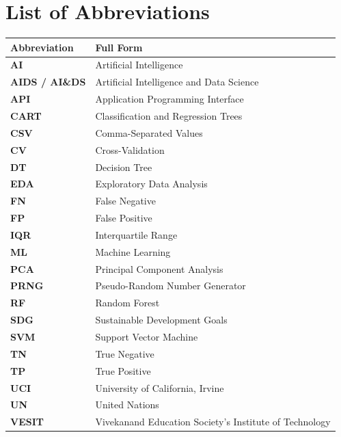 \chapter*{List of Abbreviations}

\begin{longtable}{p{3cm} p{11cm}}
\toprule
\textbf{Abbreviation} & \textbf{Full Form} \\
\midrule
\endhead
\bottomrule
\endfoot
\textbf{AI} & Artificial Intelligence \\
\textbf{AIDS / AI\&DS} & Artificial Intelligence and Data Science \\
\textbf{API} & Application Programming Interface \\
\textbf{CART} & Classification and Regression Trees \\
\textbf{CSV} & Comma-Separated Values \\
\textbf{CV} & Cross-Validation \\
\textbf{DT} & Decision Tree \\
\textbf{EDA} & Exploratory Data Analysis \\
\textbf{FN} & False Negative \\
\textbf{FP} & False Positive \\
\textbf{IQR} & Interquartile Range \\
\textbf{ML} & Machine Learning \\
\textbf{PCA} & Principal Component Analysis \\
\textbf{PRNG} & Pseudo-Random Number Generator \\
\textbf{RF} & Random Forest \\
\textbf{SDG} & Sustainable Development Goals \\
\textbf{SVM} & Support Vector Machine \\
\textbf{TN} & True Negative \\
\textbf{TP} & True Positive \\
\textbf{UCI} & University of California, Irvine \\
\textbf{UN} & United Nations \\
\textbf{VESIT} & Vivekanand Education Society's Institute of Technology \\
\bottomrule
\end{longtable}
